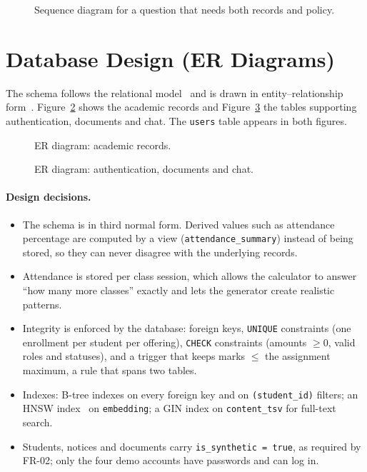 \documentclass[11pt,a4paper,oneside]{report}
\begin{document}
\begin{figure}[H]
\centering
\resizebox{\textwidth}{!}{}
\caption{Sequence diagram for a question that needs both records and policy.}
\label{fig:seq}
\end{figure}

\clearpage
\section{Database Design (ER Diagrams)}
The schema follows the relational model~\cite{codd1970} and is drawn in entity--relationship
form~\cite{chen1976}. Figure~\ref{fig:er-academic} shows the academic records and
Figure~\ref{fig:er-platform} the tables supporting authentication, documents and chat. The
\texttt{users} table appears in both figures.

\begin{figure}[H]
\centering
\resizebox{\textwidth}{!}{}
\caption{ER diagram: academic records.}
\label{fig:er-academic}
\end{figure}

\begin{figure}[H]
\centering
\resizebox{0.92\textwidth}{!}{}
\caption{ER diagram: authentication, documents and chat.}
\label{fig:er-platform}
\end{figure}

\paragraph{Design decisions.}
\begin{itemize}[itemsep=1pt]
  \item The schema is in third normal form. Derived values such as attendance percentage
        are computed by a view (\texttt{attendance\_summary}) instead of being stored, so
        they can never disagree with the underlying records.
  \item Attendance is stored per class session, which allows the calculator to answer
        ``how many more classes'' exactly and lets the generator create realistic patterns.
  \item Integrity is enforced by the database: foreign keys, \texttt{UNIQUE} constraints
        (one enrollment per student per offering), \texttt{CHECK} constraints (amounts
        $\ge 0$, valid roles and statuses), and a trigger that keeps marks $\le$ the
        assignment maximum, a rule that spans two tables.
  \item Indexes: B-tree indexes on every foreign key and on \texttt{(student\_id)} filters;
        an HNSW index~\cite{malkov2020hnsw} on \texttt{embedding}; a GIN index on
        \texttt{content\_tsv} for full-text search.
  \item Students, notices and documents carry \texttt{is\_synthetic = true}, as required by
        FR-02; only the four demo accounts have passwords and can log in.
\end{itemize}
\end{document}
